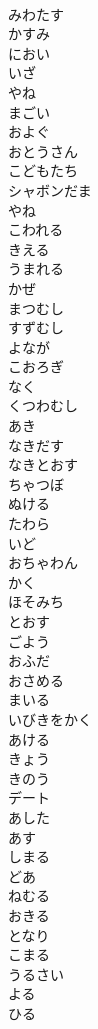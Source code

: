 \documentclass[8pt]{extreport}
\begin{document}
\begin{CJK}{UTF8}{min}
\\	みわたす
\\	かすみ
\\	におい
\\	いざ
\\	やね
\\	まごい
\\	およぐ
\\	おとうさん
\\	こどもたち
\\	シャボンだま
\\	やね
\\	こわれる
\\	きえる
\\	うまれる
\\	かぜ
\\	まつむし
\\	すずむし
\\	よなが
\\	こおろぎ
\\	なく
\\	くつわむし
\\	あき
\\	なきだす
\\	なきとおす
\\	ちゃつぼ
\\	ぬける
\\	たわら
\\	いど
\\	おちゃわん
\\	かく
\\	ほそみち
\\	とおす
\\	ごよう
\\	おふだ
\\	おさめる
\\	まいる
\\	いびきをかく
\\	あける
\\	きょう
\\	きのう
\\	デート
\\	あした 
\\	あす
\\	しまる
\\	どあ
\\	ねむる
\\	おきる
\\	となり
\\	こまる
\\	うるさい
\\	よる
\\	ひる

\end{CJK}
\end{document}
